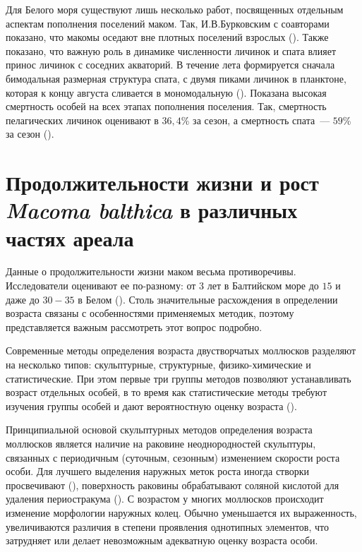 Для Белого моря существуют лишь несколько работ, посвященных отдельным аспектам пополнения поселений маком. 
Так, И.В.Бурковским с соавторами показано, что макомы оседают вне плотных поселений взрослых (\cite{Burkovskiy_et_al_1998}). 
Также показано, что важную роль в динамике численности личинок и спата влияет принос личинок с соседних акваторий. 
В течение лета формируется сначала бимодальная размерная структура спата, с двумя пиками личинок в планктоне, которая к концу августа сливается в мономодальную (\cite{Zubakha_et_al_2000}). 
Показана высокая смертность особей на всех этапах пополнения поселения. Так, смертность пелагических личинок оценивают в $36,4$\% за сезон, а смертность спата~--- $59$\% за сезон (\cite{Burkovskiy_et_al_1998}).


		\section{Продолжительности жизни и рост {\it Macoma balthica} в различных частях ареала}
Данные о продолжительности жизни маком весьма противоречивы. 
Исследователи оценивают ее по-разному: от $3$ лет в Балтийском море до $15$ и даже до $30-35$ в Белом  (\cite{Segerstrale_1960, Semenova_1970, Maximovich_Kunina_1982}). 
Столь значительные расхождения в определении возраста связаны с особенностями применяемых методик, поэтому представляется важным рассмотреть этот вопрос подробно.

Современные методы определения возраста двустворчатых моллюсков разделяют на несколько типов: скульптурные, структурные, физико-химические и статистические. 
При этом первые три группы методов позволяют устанавливать возраст отдельных особей, в то время как статистические методы требуют изучения группы особей и дают вероятностную оценку возраста (\cite{Zolotarev_1989}). 

Принципиальной основой скульптурных методов определения возраста моллюсков является наличие на раковине неоднородностей скульптуры, связанных с периодичным (суточным, сезонным) изменением скорости роста особи. 
Для лучшего выделения наружных меток роста иногда створки просвечивают (\cite{Brousseau_1979}), поверхность раковины обрабатывают соляной кислотой для удаления периостракума (\cite{Tabunkov_1974}). 
С возрастом у многих моллюсков происходит изменение морфологии наружных колец. 
Обычно уменьшается их выраженность, увеличиваются различия в степени проявления однотипных элементов, что затрудняет или делает невозможным адекватную оценку возраста особи. 	

